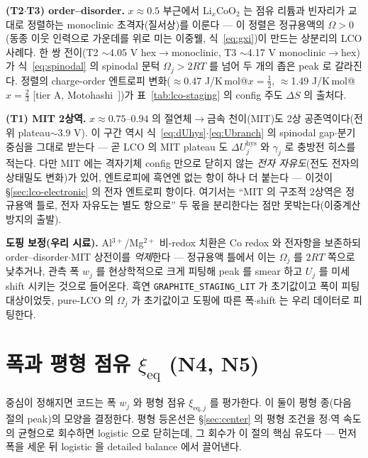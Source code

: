 \documentclass[11pt,a4paper]{article}
\newcommand{\eq}{\mathrm{eq}}
\newcommand{\hys}{\mathrm{hys}}
\newcommand{\code}[1]{\texttt{#1}}
\begin{document}
\textbf{(T2$\cdot$T3) order--disorder.} $x\approx0.5$ 부근에서 $\mathrm{Li}_x\mathrm{CoO_2}$ 는 점유 리튬과 빈자리가
교대로 정렬하는 monoclinic 초격자(질서상)를 이룬다 — 이 정렬은 정규용액의 $\Omega>0$(동종 이웃 인력으로 가운데를 위로
미는 이중웰, 식~\eqref{eq:gxi})이 만드는 상분리의 LCO 사례다. 한 쌍 전이(T2 $\sim$4.05 V hex$\to$monoclinic,
T3 $\sim$4.17 V monoclinic$\to$hex)가 식~\eqref{eq:spinodal} 의 spinodal 문턱 $\Omega_j>2RT$ 를 넘어 두 개의 좁은
peak 로 갈라진다. 정렬의 charge-order 엔트로피 변화($\approx$0.47 J/K\,mol@$x{=}\tfrac12$, $\approx$1.49 J/K\,mol@$x{=}\tfrac23$
[tier A, Motohashi~\cite{motohashi2009}])가 표~\ref{tab:lco-staging} 의 config 주도 $\Delta S$ 의 출처다.

\textbf{(T1) MIT 2상역.} $x\approx0.75$--$0.94$ 의 절연체$\to$금속 천이(MIT)도 2상 공존역이다(전위 plateau$\sim$3.9 V).
이 구간 역시 식~\eqref{eq:dUhys}$\cdot$\eqref{eq:Ubranch} 의 spinodal gap$\cdot$분기 중심을 그대로 받는다 — 곧 LCO 의
MIT plateau 도 $\Delta U_j^\hys$ 와 $\gamma_j$ 로 충방전 히스를 적는다. 다만 MIT 에는 격자기체 config 만으로 닫히지 않는
\emph{전자 자유도}(전도 전자의 상태밀도 변화)가 있어, 엔트로피에 흑연엔 없는 항이 하나 더 붙는다 — 이것이
\S\ref{sec:lco-electronic} 의 전자 엔트로피 항이다. 여기서는 ``MIT 의 구조적 2상역은 정규용액 틀로, 전자 자유도는 별도
항으로'' 두 몫을 분리한다는 점만 못박는다(이중계산 방지의 출발).

\textbf{도핑 보정(우리 시료).} Al$^{3+}$/Mg$^{2+}$ 비-redox 치환은 Co redox 와 전자항을 보존하되 order--disorder$\cdot$MIT
상전이를 \emph{억제}한다 — 정규용액 틀에서 이는 $\Omega_j$ 를 $2RT$ 쪽으로 낮추거나, 관측 폭 $w_j$ 를 현상학적으로 크게
피팅해 peak 를 smear 하고 $U_j$ 를 미세 shift 시키는 것으로 들어온다. 흑연 \code{GRAPHITE\_STAGING\_LIT} 가 초기값이고 폭이
피팅 대상이었듯, pure-LCO 의 $\Omega_j$ 가 초기값이고 도핑에 따른 폭$\cdot$shift 는 우리 데이터로 피팅한다.

\section{폭과 평형 점유 $\xi_\eq$ (N4, N5)}\label{sec:width}
중심이 정해지면 코드는 폭 $w_j$ 와 평형 점유 $\xi_{\eq,j}$ 를 평가한다. 이 둘이 평형 종(다음 절의 peak)의 모양을
결정한다. 평형 등온선은 \S\ref{sec:center} 의 평형 조건을 정$\cdot$역 속도의 균형으로 회수하면 logistic 으로 닫히는데,
그 회수가 이 절의 핵심 유도다 — 먼저 폭을 세운 뒤 logistic 을 detailed balance 에서 끌어낸다.
\end{document}
